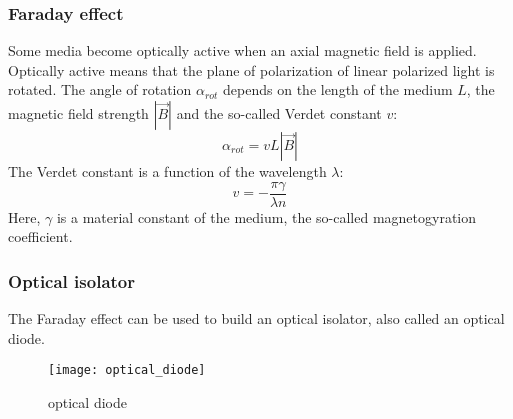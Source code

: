 \subsubsection{Faraday effect}
Some media become optically active when an axial magnetic field is applied.
Optically active means that the plane of polarization of linear
polarized light is rotated. The angle of rotation $\alpha_{rot}$ depends
on the length of the medium $L$, the magnetic field strength $|\vec B|$ and
the so-called Verdet constant $v$:
\begin{equation}
    \alpha_{rot}=vL|\vec B|
\end{equation}
The Verdet constant is a function of the wavelength $\lambda$:
\begin{equation}
    v=-\frac{\pi\gamma}{\lambda n}
\end{equation}
Here, $\gamma$ is a material constant of the medium, the so-called
magnetogyration coefficient.

\subsubsection{Optical isolator}
The Faraday effect can be used to build an optical isolator, also called
an optical diode.
\begin{figure}[h!]
    \center
    \texttt{[image: optical\_diode]}
    \caption{optical diode}
    \label{optical_diode}
\end{figure}


\newpage
